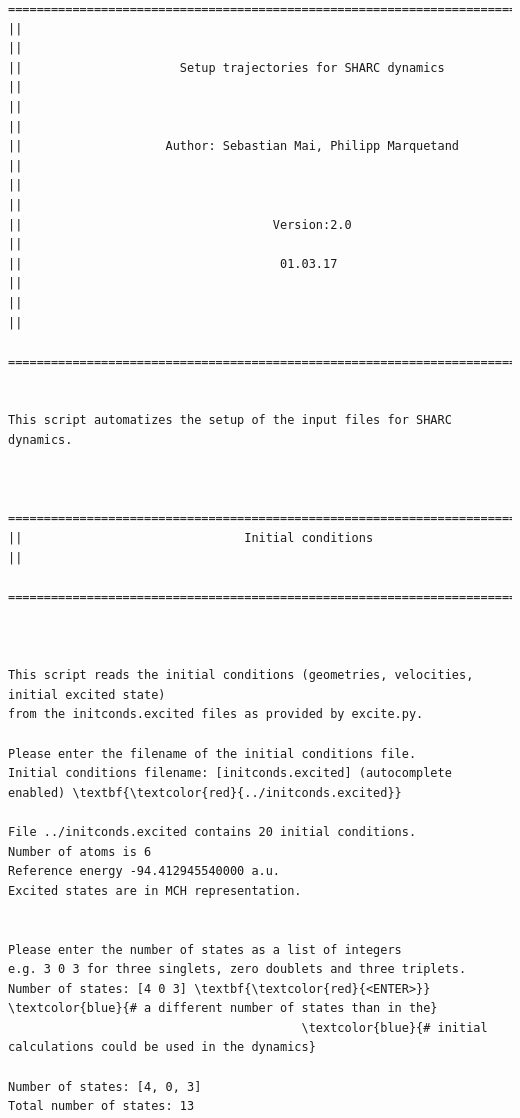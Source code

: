 \documentclass[a4paper,11pt,DIV=15,openany]{scrbook}
\begin{document}
\begin{oframed}
\footnotesize\begin{Verbatim}[commandchars=\\\{\}]
  ================================================================================
||                                                                                ||
||                      Setup trajectories for SHARC dynamics                     ||
||                                                                                ||
||                    Author: Sebastian Mai, Philipp Marquetand                   ||
||                                                                                ||
||                                   Version:2.0                                  ||
||                                    01.03.17                                    ||
||                                                                                ||
  ================================================================================


This script automatizes the setup of the input files for SHARC dynamics.
  

  ================================================================================
||                               Initial conditions                               ||
  ================================================================================



This script reads the initial conditions (geometries, velocities, initial excited state)
from the initconds.excited files as provided by excite.py.

Please enter the filename of the initial conditions file.
Initial conditions filename: [initconds.excited] (autocomplete enabled) \textbf{\textcolor{red}{../initconds.excited}}

File ../initconds.excited contains 20 initial conditions.
Number of atoms is 6
Reference energy -94.412945540000 a.u.
Excited states are in MCH representation.


Please enter the number of states as a list of integers
e.g. 3 0 3 for three singlets, zero doublets and three triplets.
Number of states: [4 0 3] \textbf{\textcolor{red}{<ENTER>}}        \textcolor{blue}{# a different number of states than in the}
                                         \textcolor{blue}{# initial calculations could be used in the dynamics}

Number of states: [4, 0, 3]
Total number of states: 13


\end{Verbatim}
\end{oframed}
\end{document}
